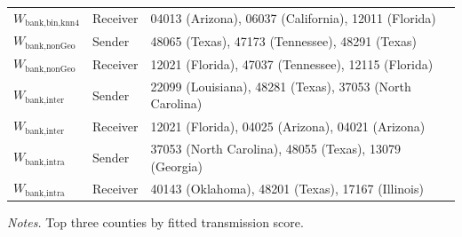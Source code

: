 \begin{table}[htbp]
\begin{tabular}{lll}
    $W_{\text{bank,bin,knn4}}$ & Receiver & 04013 (Arizona), 06037 (California), 12011 (Florida) \\
    $W_{\text{bank,nonGeo}}$ & Sender & 48065 (Texas), 47173 (Tennessee), 48291 (Texas) \\
    $W_{\text{bank,nonGeo}}$ & Receiver & 12021 (Florida), 47037 (Tennessee), 12115 (Florida) \\
    $W_{\text{bank,inter}}$ & Sender & 22099 (Louisiana), 48281 (Texas), 37053 (North Carolina) \\
    $W_{\text{bank,inter}}$ & Receiver & 12021 (Florida), 04025 (Arizona), 04021 (Arizona) \\
    $W_{\text{bank,intra}}$ & Sender & 37053 (North Carolina), 48055 (Texas), 13079 (Georgia) \\
    $W_{\text{bank,intra}}$ & Receiver & 40143 (Oklahoma), 48201 (Texas), 17167 (Illinois) \\
    \bottomrule
  \end{tabular}
  \begin{tablenotes}\footnotesize
  \item \emph{Notes.} Top three counties by fitted transmission score.
  \end{tablenotes}
\end{table}

\clearpage
 
